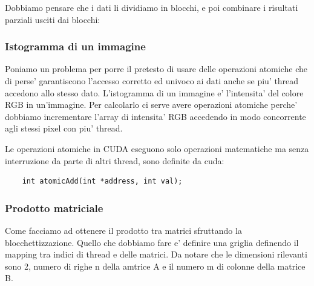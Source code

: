 Dobbiamo pensare che i dati li dividiamo in blocchi, e poi combinare i risultati parziali usciti dai blocchi:


\subsubsection{Istogramma di un immagine}
Poniamo un problema per porre il pretesto di usare delle operazioni atomiche che di perse' garantiscono l'accesso corretto ed univoco ai dati anche se piu' thread accedono allo stesso dato.
L'istogramma di un immagine e' l'intensita' del colore RGB in un'immagine. Per calcolarlo ci serve avere operazioni atomiche perche' dobbiamo incrementare l'array di intensita' RGB accedendo in modo concorrente agli stessi pixel con piu' thread.

Le operazioni atomiche in CUDA eseguono solo operazioni matematiche ma senza interruzione da parte di altri thread, sono definite da cuda:
\begin{lstlisting}
    int atomicAdd(int *address, int val);
\end{lstlisting}

\subsubsection{Prodotto matriciale}
Come facciamo ad ottenere il prodotto tra matrici sfruttando la blocchettizzazione. Quello che dobbiamo fare e' definire una griglia definendo il mapping tra indici di thread e delle matrici. Da notare che le dimensioni rilevanti sono 2, numero di righe n della amtrice A e il numero m di colonne della matrice B. 